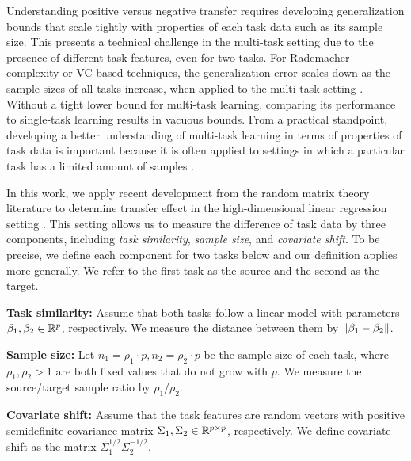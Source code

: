 Understanding positive versus negative transfer requires developing generalization bounds that scale tightly with properties of each task data such as its sample size.
This presents a technical challenge in the multi-task setting due to the presence of different task features, even for two tasks.
For Rademacher complexity or VC-based techniques, the generalization error scales down as the sample sizes of all tasks increase, when applied to the multi-task setting \cite{B00,AZ05,M06,MPR16,WZR20}.
Without a tight lower bound for multi-task learning, comparing its performance to single-task learning results in vacuous bounds.
From a practical standpoint, developing a better understanding of multi-task learning in terms of properties of task data is important because it is often applied to settings in which a particular task has a limited amount of samples \cite{RH19}.


In this work, we apply recent development from the random matrix theory literature \cite{erdos2017dynamical,isotropic,Anisotropic} to determine transfer effect in the high-dimensional linear regression setting \cite{HMRT19,BLLT20}.
This setting allows us to measure the difference of task data by three components, including \textit{task similarity}, \textit{sample size}, and \textit{covariate shift}.
To be precise, we define each component for two tasks below and our definition applies more generally.
We refer to the first task as the source and the second as the target.
\squishlist
	\item \textbf{Task similarity:} Assume that both tasks follow a linear model with parameters $\beta_1, \beta_2\in\mathbb{R}^p$, respectively.
	We measure the distance between them by $\|\beta_1 - \beta_2\|$.
	\item \textbf{Sample size:} Let $n_1 = \rho_1 \cdot p, n_2 = \rho_2 \cdot p$ be the sample size of each task, where $\rho_1, \rho_2>1$ are both fixed values that do not grow with $p$.
	We measure the source/target sample ratio by $\rho_1 / \rho_2$.
	\item \textbf{Covariate shift:} Assume that the task features are random vectors with positive semidefinite covariance matrix $\Sigma_1,\Sigma_2\in\mathbb{R}^{p\times p}$, respectively.
	We define covariate shift as the matrix $\Sigma_1^{1/2}\Sigma_2^{-1/2}$.
\squishend

